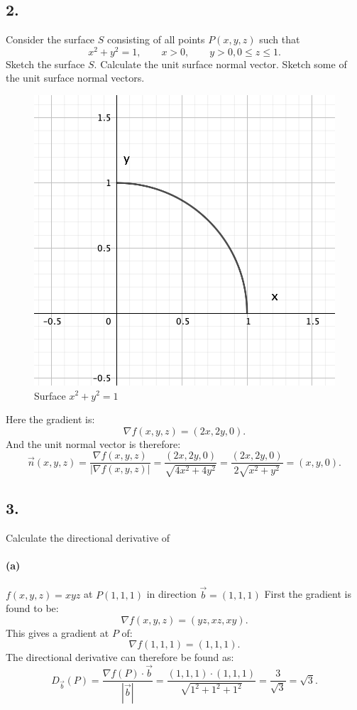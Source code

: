 \subsection*{2.} Consider the surface $S$ consisting of all points $P(x,y,z)$ such that
\[ 
x^2 + y^2 = 1, \qquad x > 0, \qquad y > 0, 0 \leq z \leq 1
.\]
Sketch the surface $S$. Calculate the unit surface normal vector. Sketch some of the unit surface normal vectors.
\begin{figure} [ht]
  \centering
  \includegraphics[width=0.5\linewidth]{./figures/e23f3.png}
  \caption{Surface $x^2 + y^2 = 1$}
  \label{fig:e23f3}
\end{figure}
Here the gradient is:
\[ 
\nabla f \left( x,y,z \right) = \left( 2x, 2y, 0 \right) 
.\]
And the unit normal vector is therefore:
\[
  \Vec{n}\left( x,y,z \right) = \frac{\nabla f \left( x,y,z \right) }{\left| \nabla f \left( x,y,z \right)  \right|} = \frac{\left( 2x,2y,0 \right) }{\sqrt{4x^2 + 4y^2}} = \frac{\left( 2x, 2y, 0 \right) }{2 \sqrt{x^2 + y^2}} = \left( x,y, 0 \right) 
.\]



\subsection*{3.} Calculate the directional derivative of

\paragraph{(a)} $f(x,y,z)=xyz$ at $P(1,1,1)$ in direction $\Vec{b} = \left( 1,1,1 \right) $
\bigbreak
First the gradient is found to be:
\[ 
\nabla f \left( x,y,z \right) = \left( yz, xz, xy \right) 
.\]
This gives a gradient at $P$ of:
\[ 
\nabla f \left( 1,1,1 \right) = \left( 1,1,1 \right) 
.\]
The directional derivative can therefore be found as:
\[ 
D_{\Vec{b}}\left( P \right) = \frac{\nabla f(P) \cdot \Vec{b}}{\left| \Vec{b} \right|} = \frac{\left( 1,1,1 \right) \cdot \left( 1,1,1 \right) }{\sqrt{1^2+1^2+1^2}} = \frac{3}{\sqrt{3}} = \sqrt{3}
.\]



